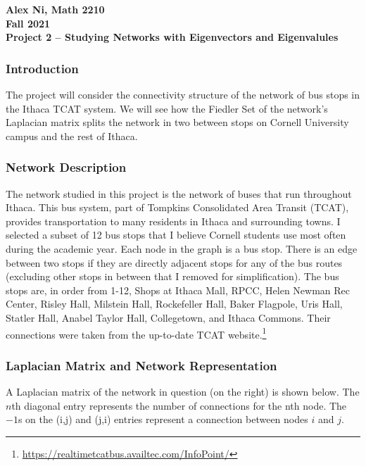 \documentclass[letterpaper,12pt]{article}
\begin{document}
\begin{center} \textbf{Alex Ni, Math 2210 \\ Fall 2021 \\ Project 2 -- Studying Networks with Eigenvectors and Eigenvalules\\ }
\hrulefill
\end{center}


\subsubsection*{Introduction}
The project will consider the connectivity structure of the network of bus stops in the Ithaca TCAT system. We will see how the Fiedler Set of the network's Laplacian matrix splits the network in two between stops on Cornell University campus and the rest of Ithaca.

\subsubsection*{Network Description}
The network studied in this project is the network of buses that run throughout Ithaca. This bus system, part of Tompkins Consolidated Area Transit (TCAT), provides transportation to many residents in Ithaca and surrounding towns. I selected a subset of 12 bus stops that I believe Cornell students use most often during the academic year. Each node in the graph is a bus stop. There is an edge between two stops if they are directly adjacent stops for any of the bus routes (excluding other stops in between that I removed for simplification). The bus stops are, in order from 1-12, Shops at Ithaca Mall, RPCC, Helen Newman Rec Center, Risley Hall, Milstein Hall, Rockefeller Hall, Baker Flagpole, Uris Hall, Statler Hall, Anabel Taylor Hall, Collegetown, and Ithaca Commons. Their connections were taken from the up-to-date TCAT website.\footnote{\href{https://realtimetcatbus.availtec.com/InfoPoint/}{https://realtimetcatbus.availtec.com/InfoPoint/}}


\subsubsection*{Laplacian Matrix and Network Representation}
A Laplacian matrix of the network in question (on the right) is shown below. The $n$th diagonal entry represents the number of connections for the nth node. The $-1$s on the (i,j) and (j,i) entries represent a connection between nodes $i$ and $j$.
\end{document}
